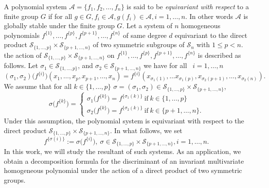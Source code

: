 \documentclass[12pt,a4paper,reqno]{amsart}
\theoremstyle{definition}
\theoremstyle{remark}
\numberwithin{equation}{section}
\begin{document}
A polynomial system $\mathcal{A}= \{ f_1, f_2, \ldots,f_n\}$ is said to be {\it equivariant with respect} to a finite group $G $ if for all $g \in G , f_i \in \mathcal{A}, g(f_i) \in \mathcal{A}, i= 1,\ldots,n.$ In other words $\mathcal{A}$ is globally stable under the finite group $G$.
Let a system of $n$ homogeneous polynomials  $f^{\{1\}},\ldots, f^{\{p\}}, f^{\{p+1\}},\ldots, f^{\{n\}}$ 
of same degree $d$ equivariant to the direct product $\mathcal{S}_{\{1
,\ldots,p\}}\times\mathcal{S}_{\{p+1,\ldots,n\}} $ of two symmetric subgroups of  $\mathcal{S}_{n}$ with $1\leq p< n$. the action of $\mathcal{S}_{\{1,\ldots,p\}}\times\mathcal{S}_{\{p+1,\ldots,n\}} $ on  $f^{\{1\}},\ldots, f^{\{p\}}, f^{\{p+1\}},\ldots, f^{\{n\}}$ is described as follows. Let $\sigma_1\in \mathcal{S}_{\{1,\ldots,p\}}$, and $\sigma_2\in \mathcal{S}_{\{p+1
,\ldots,n\}}$ we have for all  \ $ i= 1,\ldots,n $ \\
$$(\sigma_1,\sigma_2)\Big(f^{\{i\}} \Big)(x_1,\ldots,x_p,x_{p+1},\ldots,x_n)=f^{\{i\}}(x_{\sigma_1(1)},\ldots x_{\sigma_1(p)},x_{\sigma_2(p+1)},\ldots,x_{\sigma_2(n)}).$$
We assume that for all $k \in \{1,\ldots,p\}$ $\sigma= (\sigma_1, \sigma_2) \in \mathcal{S}_{\{1,\ldots,p\}}\times\mathcal{S}_{\{p+1,\ldots,n\}}$, 
\begin{equation}
\sigma \Big( f^{\{k\}} \Big)= \begin{cases}
\sigma_1 \Big( f^{\{k\}} \Big)= f^{\{ {\sigma_1(k)} \}}\  \mbox{if}\  k\in \{1,\ldots,p\} \\
\sigma_2 \Big( f^{\{k\}} \Big)= f^{\{ {\sigma_2(k)} \}}\  \mbox{if}\  k\in \{p+1,\ldots,n\}.
\end{cases}
\end{equation}
Under this assumption, the polynomial system is equivariant with respect to the direct product $\mathcal{S}_{\{1,\ldots,p\}}\times\mathcal{S}_{\{p+1,\ldots,n\}}.$ In what follows, we set 
\begin{equation}\label{eq:GG}
 f^{\{\sigma(i)\}} := \sigma \Big( f^{\{i\}} \Big), \  \sigma \in \mathcal{S}_{\{1,\ldots,p\}}\times\mathcal{S}_{\{p+1,\ldots,n\}}, i=1,\ldots,n.
 \end{equation}
In this work, we will study the resultant of such systems. As an application, we obtain a decomposition formula for the discriminant of an invariant multivariate homogeneous polynomial under the action of a direct product of two symmetric groups.
\end{document}

